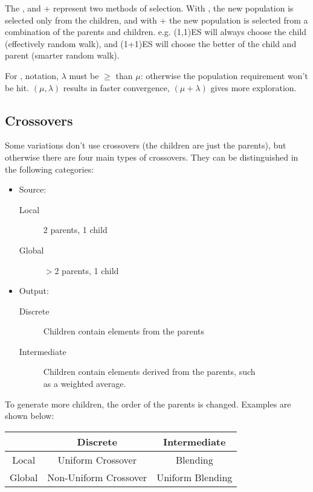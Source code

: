 The , and + represent two methods of selection. With , the new population is selected only from the children, and with + the new population is selected from a combination of the parents and children. e.g. (1,1)ES will always choose the child (effectively random walk), and (1+1)ES will choose the better of the child and parent (smarter random walk). 

For , notation, $\lambda$ must be $\geq$ than $\mu$: otherwise the population requirement won't be hit. $(\mu, \lambda)$ results in faster convergence, $(\mu + \lambda)$ gives more exploration. 

\subsection{Crossovers}
Some variations don't use crossovers (the children are just the parents), but otherwise there are four main types of crossovers. They can be distinguished in the following categories:

\begin{itemize}
    \item Source:
    \begin{description}
        \item [Local] 2 parents, 1 child
        \item [Global] $>$2 parents, 1 child
    \end{description}
    \item Output:
    \begin{description}
        \item [Discrete] Children contain elements from the parents
        \item[Intermediate] Children contain elements derived from the parents, such \\ as a weighted average.
    \end{description}
\end{itemize}

To generate more children, the order of the parents is changed. Examples are shown below: 
\begin{table}[H]
\centering
\begin{tabular}{|c|c|c|}
\hline
 & Discrete & Intermediate \\ \hline
Local & Uniform Crossover & Blending \\ \hline
Global & Non-Uniform Crossover  & Uniform Blending \\ \hline
\end{tabular}
\end{table}

